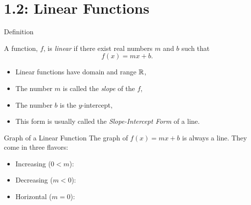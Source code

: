\documentclass[Lecture.tex]{subfiles}
\begin{document}
\section{1.2: Linear Functions}

\begin{frame}{Definition}
  \begin{defn}
    A function, $f$, is {\it linear} if there exist real numbers $m$ and $b$ such that
    $$f(x) = mx + b.$$
    \begin{itemize}
    \item<2->
      Linear functions have domain and range $\mathbb{R}$,
    \item<3->
      The number $m$ is called the {\it slope} of the $f$,
    \item<4->
      The number $b$ is the $y$-intercept,
    \item<5->
      This form is usually called the {\it Slope-Intercept Form} of a line.
    \end{itemize}
  \end{defn}
\end{frame}

\begin{frame}{Graph of a Linear Function}
  The graph of $f(x) = mx + b$ is always a line.
  \pause
  They come in three flavors:
  \begin{itemize}
  \item<3->
    Increasing ($0 < m$):
    \begin{center}
    \end{center}
  \item<4->
    Decreasing ($m < 0$):
    \begin{center}
    \end{center}
  \item<5->
    Horizontal ($m = 0$):
    \begin{center}
    \end{center}
  \end{itemize}
  
\end{frame}
\end{document}
